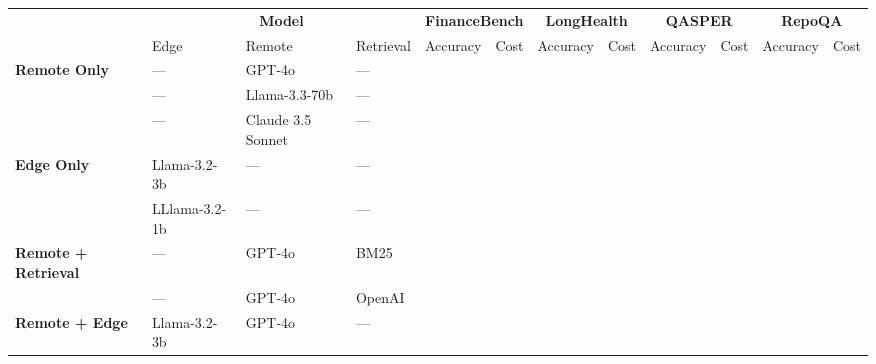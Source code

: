 \begin{table}[ht]
    \centering
    \scriptsize
\begin{tabular}{llllllllllll}
                                                & \multicolumn{3}{c}{\textbf{Model}}                     & \multicolumn{2}{c}{\textbf{FinanceBench}} & \multicolumn{2}{c}{\textbf{LongHealth}} & \multicolumn{2}{c}{\textbf{QASPER}} & \multicolumn{2}{c}{\textbf{RepoQA}} \\
                                                & Edge          & Remote            & Retrieval & Accuracy  & Cost & Accuracy         & Cost        & Accuracy       & Cost      & Accuracy       & Cost      \\ \hline \hline
\textbf{Remote Only }                         & ---           & GPT-4o            & ---       &           &                      &                  &             &                &           &                &           \\
                                                & ---           & Llama-3.3-70b     & ---       &           &                      &                  &             &                &           &                &           \\
                                                & ---           & Claude 3.5 Sonnet & ---       &           &                      &                  &             &                &           &                &           \\
\textbf{Edge Only }                           & Llama-3.2-3b  & ---               & ---       &           &                      &                  &             &                &           &                &           \\
                                                & LLlama-3.2-1b & ---               & ---       &           &                      &                  &             &                &           &                &           \\
\textbf{Remote + Retrieval }             & ---           & GPT-4o            & BM25      &           &                      &                  &             &                &           &                &           \\
                                                & ---           & GPT-4o            & OpenAI    &           &                      &                  &             &                &           &                &           \\ \hline
\textbf{Remote + Edge  }            & Llama-3.2-3b  & GPT-4o            & ---       &           &                      &                  &             &                &           &                &           \\

\end{tabular}
\end{table}
